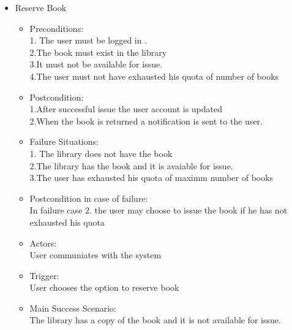 \documentclass[a4paper]{article}
\begin{document}
\begin{enumerate}
\begin{itemize}
 \item Reserve Book\\
	\begin{itemize}
	\item  Preconditions:\\
	1. The user must be logged in .\\
	2.The book must exist in the library\\ 
	3.It must not  be available for issue.\\
	4.The user must not have exhausted his quota of number of books\\
 \item Postcondition:\\
 1.After successful issue the user account is updated \\
 2.When the book is returned a notification is sent to the user.\\
 \item Failure Situations:\\
 1. The library does not have  the book \\
 2.The library has the book and it is  avaiable for issue.\\
 3.The user has exhausted his quota of maximm number of books\\
 \item Postcondition in case of failure:\\In failure case 2. the user may choose to issue the book if he has not exhausted his quota\\
 \item Actors:\\ User communiates with the system\\
 \item Trigger:\\ User chooses the option to reserve book\\
 \item Main Success Scenario:\\ The library has a copy of the book and it is not available for issue.\\
 
	\end{itemize}
 

\end{itemize}
\end{enumerate}
\end{document}
